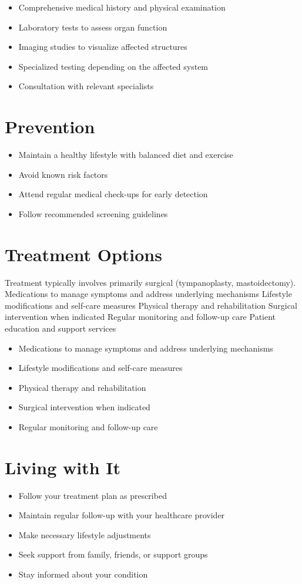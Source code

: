 \begin{itemize}[noitemsep]
  \item Comprehensive medical history and physical examination
  \item Laboratory tests to assess organ function
  \item Imaging studies to visualize affected structures
  \item Specialized testing depending on the affected system
  \item Consultation with relevant specialists
\end{itemize}
\section{Prevention}
\begin{itemize}[noitemsep]
  \item Maintain a healthy lifestyle with balanced diet and exercise
  \item Avoid known risk factors
  \item Attend regular medical check-ups for early detection
  \item Follow recommended screening guidelines
\end{itemize}
\section{Treatment Options}
Treatment typically involves primarily surgical (tympanoplasty, mastoidectomy). Medications to manage symptoms and address underlying mechanisms Lifestyle modifications and self-care measures Physical therapy and rehabilitation Surgical intervention when indicated Regular monitoring and follow-up care Patient education and support services

\begin{itemize}[noitemsep]
  \item Medications to manage symptoms and address underlying mechanisms
  \item Lifestyle modifications and self-care measures
  \item Physical therapy and rehabilitation
  \item Surgical intervention when indicated
  \item Regular monitoring and follow-up care
\end{itemize}
\section{Living with It}
\begin{itemize}[noitemsep]
  \item Follow your treatment plan as prescribed
  \item Maintain regular follow-up with your healthcare provider
  \item Make necessary lifestyle adjustments
  \item Seek support from family, friends, or support groups
  \item Stay informed about your condition
\end{itemize}
